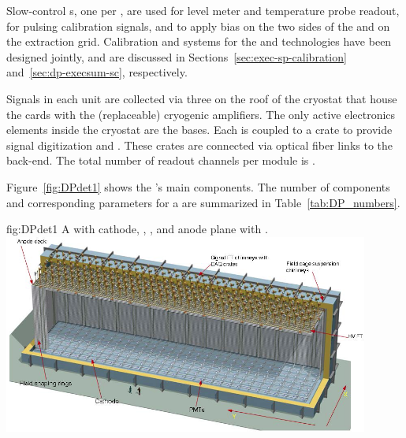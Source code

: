Slow-control \fdth{}s,  one per , are used for level meter and temperature probe readout,  for pulsing calibration signals, and to apply  bias on the two sides of the  and on the extraction grid. Calibration and  systems for the  and  technologies have been designed jointly, and are discussed in Sections~\ref{sec:exec-sp-calibration} and~\ref{sec:dp-execsum-sc}, respectively.

Signals in each  unit are collected via three  on the roof of the cryostat that house the  cards with the (replaceable) cryogenic  amplifiers.  The only active electronics elements inside the cryostat are the  bases.  Each  is coupled to a  crate to provide signal digitization and . These crates are connected  via optical fiber links to the  back-end. The total number of readout channels  per \nominalmodsize module is \dpnumcrpch.

Figure~\ref{fig:DPdet1} shows the 's main components. The number of components and corresponding parameters for a \dpactivelarmass {} are summarized in Table~\ref{tab:DP_numbers}.

\begin{dunefigure}{fig:DPdet1}
  {A  with cathode, , , and anode plane with .}
  \includegraphics[width=0.9\textwidth]{graphics/DUNE-CDR-detectors-volume-optim.png}
\end{dunefigure}




